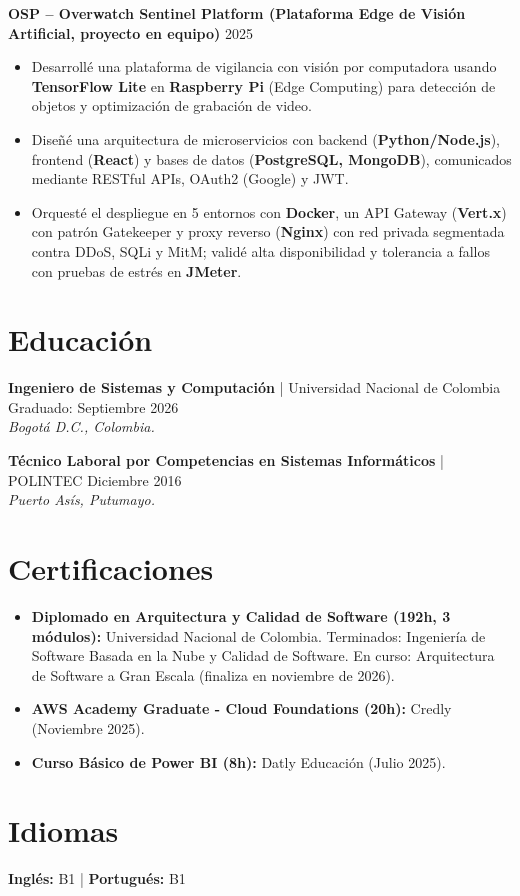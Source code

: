 \documentclass[11pt,a4paper]{article}
\begin{document}
\vspace{0.2cm}

\noindent
\textbf{OSP – Overwatch Sentinel Platform (Plataforma Edge de Visión Artificial, proyecto en equipo)} \hfill 2025
\begin{itemize}[leftmargin=*, noitemsep, topsep=2pt]
    \item Desarrollé una plataforma de vigilancia con visión por computadora usando \textbf{TensorFlow Lite} en \textbf{Raspberry Pi} (Edge Computing) para detección de objetos y optimización de grabación de video.
    \item Diseñé una arquitectura de microservicios con backend (\textbf{Python/Node.js}), frontend (\textbf{React}) y bases de datos (\textbf{PostgreSQL, MongoDB}), comunicados mediante RESTful APIs, OAuth2 (Google) y JWT.
    \item Orquesté el despliegue en 5 entornos con \textbf{Docker}, un API Gateway (\textbf{Vert.x}) con patrón Gatekeeper y proxy reverso (\textbf{Nginx}) con red privada segmentada contra DDoS, SQLi y MitM; validé alta disponibilidad y tolerancia a fallos con pruebas de estrés en \textbf{JMeter}.
\end{itemize}

\section*{Educación}

\noindent
\textbf{Ingeniero de Sistemas y Computación} | Universidad Nacional de Colombia \hfill Graduado: Septiembre 2026 \\
\textit{Bogotá D.C., Colombia.}

\vspace{0.2cm}

\noindent
\textbf{Técnico Laboral por Competencias en Sistemas Informáticos} | POLINTEC \hfill Diciembre 2016 \\
\textit{Puerto Asís, Putumayo.}

\section*{Certificaciones}
\begin{itemize}[leftmargin=*, noitemsep]
    \item \textbf{Diplomado en Arquitectura y Calidad de Software (192h, 3 módulos):} Universidad Nacional de Colombia. Terminados: Ingeniería de Software Basada en la Nube y Calidad de Software. En curso: Arquitectura de Software a Gran Escala (finaliza en noviembre de 2026).
    \item \textbf{AWS Academy Graduate - Cloud Foundations (20h):} Credly (Noviembre 2025).
    \item \textbf{Curso Básico de Power BI (8h):} Datly Educación (Julio 2025).
\end{itemize}

\section*{Idiomas}
\noindent
\textbf{Inglés:} B1 | \textbf{Portugués:} B1
\end{document}
